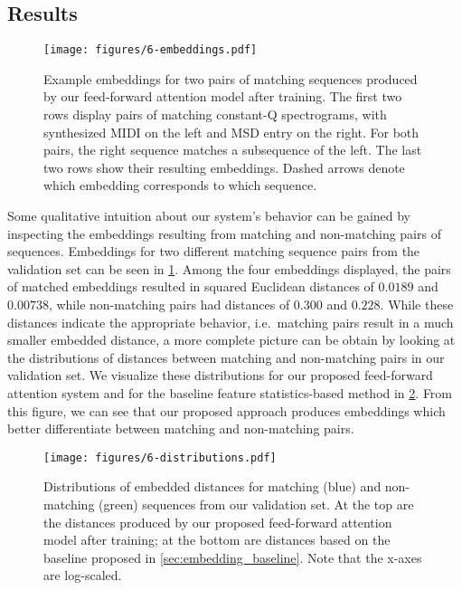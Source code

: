 \subsection{Results}
\label{sec:pse_results}

\begin{figure}
  \texttt{[image: figures/6-embeddings.pdf]}
  \caption[Example embeddings for two pairs of sequences]{Example embeddings for two pairs of matching sequences produced by our feed-forward attention model after training.
The first two rows display pairs of matching constant-Q spectrograms, with synthesized MIDI on the left and MSD entry on the right.
For both pairs, the right sequence matches a subsequence of the left.
The last two rows show their resulting embeddings.
Dashed arrows denote which embedding corresponds to which sequence.}
  \label{fig:embeddings}
\end{figure}

Some qualitative intuition about our system's behavior can be gained by inspecting the embeddings resulting from matching and non-matching pairs of sequences.
Embeddings for two different matching sequence pairs from the validation set can be seen in \cref{fig:embeddings}.
Among the four embeddings displayed, the pairs of matched embeddings resulted in squared Euclidean distances of $0.0189$ and $0.00738$, while non-matching pairs had distances of $0.300$ and $0.228$.
While these distances indicate the appropriate behavior, i.e.\ matching pairs result in a much smaller embedded distance, a more complete picture can be obtain by looking at the distributions of distances between matching and non-matching pairs in our validation set.
We visualize these distributions for our proposed feed-forward attention system and for the baseline feature statistics-based method in \cref{fig:embedding_distributions}.
From this figure, we can see that our proposed approach produces embeddings which better differentiate between matching and non-matching pairs.

\begin{figure}
  \texttt{[image: figures/6-distributions.pdf]}
  \caption[Distributions of matching and non-matching distances]{Distributions of embedded distances for matching (blue) and non-matching (green) sequences from our validation set.
At the top are the distances produced by our proposed feed-forward attention model after training; at the bottom are distances based on the baseline proposed in \cref{sec:embedding_baseline}.
Note that the x-axes are log-scaled.}
  \label{fig:embedding_distributions}
\end{figure}

